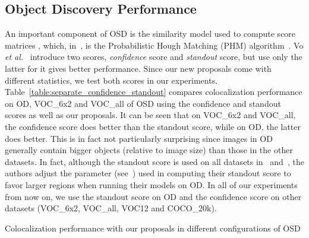 \documentclass[runningheads]{llncs}
\begin{document}
\subsection{Object Discovery Performance}
 An important component of OSD is the similarity model used to compute score matrices , which, in~\cite{Vo2019UnsupOptim}, is the Probabilistic Hough Matching (PHM) algorithm~\cite{CKSP15}. Vo {\em et al.}~\cite{Vo2019UnsupOptim} introduce two scores, \textit{confidence} score and \textit{standout} score, but use only the latter for it gives better performance. Since our new proposals come with different statistics, we test both scores in our experiments. Table~\ref{table:separate_confidence_standout} compares colocalization performance on OD, VOC\_6x2 and VOC\_all of OSD using the confidence and standout scores as well as our proposals. It can be seen that on VOC\_6x2 and VOC\_all, the confidence score does better than the standout score, while on OD, the latter does better. This is in fact not particularly surprising since images in OD generally contain bigger objects (relative to image size) than those in the other datasets. In fact, although the standout score is used on all datasets in~\cite{CKSP15} and~\cite{Vo2019UnsupOptim}, the authors adjust the parameter  (see~\cite{CKSP15}) used in computing their standout score to favor larger regions when running their models on OD. In all of our experiments from now on, we use the standout score on OD and the confidence score on other datasets (VOC\_6x2, VOC\_all, VOC12 and COCO\_20k).
\begin{table}[tb]
    \parbox[t][][t]{0.38\linewidth}{
    \caption{\small Colocalization performance with our proposals in different configurations of OSD}
    \label{table:separate_confidence_standout}
    \centering
    }
    \hfill 
    \parbox[t][][t]{0.6\linewidth}{
    \caption{\small Colocalization performance for different values of hyper-parameters}
    \label{table:hyperparameters}
    \centering
    }
\end{table}
\end{document}
